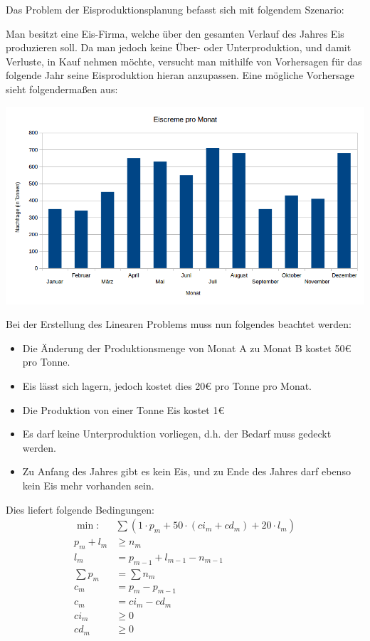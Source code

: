 Das Problem der Eisproduktionsplanung befasst sich mit folgendem Szenario:

Man besitzt eine Eis-Firma, welche über den gesamten Verlauf des Jahres Eis produzieren soll. Da man jedoch keine Über- oder Unterproduktion, und damit Verluste, in Kauf nehmen möchte, versucht man mithilfe von Vorhersagen für das folgende Jahr seine Eisproduktion hieran anzupassen. Eine mögliche Vorhersage sieht folgendermaßen aus:

\centering
\includegraphics[width=\textwidth]{Grafiken/Eiscreme.png}

\raggedright
Bei der Erstellung des Linearen Problems muss nun folgendes beachtet werden:

\begin{itemize}
\item Die Änderung der Produktionsmenge von Monat A zu Monat B kostet 50€ pro Tonne.
\item Eis lässt sich lagern, jedoch kostet dies 20€ pro Tonne pro Monat.
\item Die Produktion von einer Tonne Eis kostet 1€
\item Es darf keine Unterproduktion vorliegen, d.h. der Bedarf muss gedeckt werden.
\item Zu Anfang des Jahres gibt es kein Eis, und zu Ende des Jahres darf ebenso kein Eis mehr vorhanden sein.
\end{itemize}

Dies liefert folgende Bedingungen:
\begin{align*}
 \min: &\sum (1 \cdot p_m + 50 \cdot (ci_m + cd_m) + 20 \cdot l_m) \\
 p_m + l_m &\geq n_m  \\
 l_m &= p_{m-1} + l_{m-1} - n_{m-1} \\
 \sum p_m &= \sum n_m \\
 c_m &= p_{m} - p_{m-1} \\
 c_m &= ci_m - cd_m \\
 ci_m &\geq 0		\\
 cd_m &\geq 0
\end{align*}

